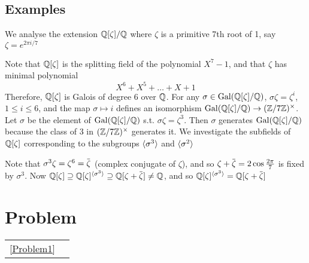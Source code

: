\documentclass[11pt]{article}
\begin{document}
\subsection{Examples}
\label{sec:orgcb5d610}
\begin{examplle}[]
We analyse the extension \(\mathbb{Q}[\zeta]/\mathbb{Q}\) where \(\zeta\) is a primitive 7th root of 1, say \(\zeta=e^{2\pi i/7}\)

Note that \(\mathbb{Q}[\zeta]\) is the splitting field of the polynomial \(X^7-1\), and that \(\zeta\) has minimal
polynomial
\begin{equation*}
X^6+X^5+\dots+X+1
\end{equation*}
Therefore, \(\mathbb{Q}[\zeta]\) is Galois of degree 6 over \(\mathbb{Q}\). For any \(\sigma\in\operatorname{Gal}(\mathbb{Q}[\zeta]/\mathbb{Q})\), \(\sigma\zeta=\zeta^i\),
\(1\le i\le 6\), and the map \(\sigma\mapsto i\) defines an isomorphism \(\operatorname{Gal}(\mathbb{Q}[\zeta]/\mathbb{Q})\to(\mathbb{Z}/7\mathbb{Z})^\times\). Let \(\sigma\) be the
element of \(\operatorname{Gal}(\mathbb{Q}[\zeta]/\mathbb{Q})\) s.t. \(\sigma\zeta=\zeta^3\). Then \(\sigma\) generates \(\operatorname{Gal}(\mathbb{Q}[\zeta]/\mathbb{Q})\) because the class
of 3 in \((\mathbb{Z}/7\mathbb{Z})^\times\) generates it. We investigate the subfields of \(\mathbb{Q}[\zeta]\) corresponding to the
subgroups \(\langle\sigma^3\rangle\) and \(\langle\sigma^2\rangle\)

\begin{center}\end{center}


Note that \(\sigma^3\zeta=\zeta^6=\barzeta\) (complex conjugate of \(\zeta\)), and so \(\zeta+\barzeta=2\cos\frac{2\pi}{7}\)
is fixed by \(\sigma^3\). Now \(\Q[\zeta]\supseteq\Q[\zeta]^{\la\sigma^3\ra}\supseteq\Q[\zeta+\barzeta]\neq\Q\), and so \(\Q[\zeta]^{\la\sigma^3\ra}=\Q[\zeta+\barzeta]\)
\end{examplle}


\section{Problem}
\label{sec:org6e00d89}
\begin{center}
\begin{tabular}{ll}
\ref{Problem1} & \\
\end{tabular}
\end{center}
\end{document}
